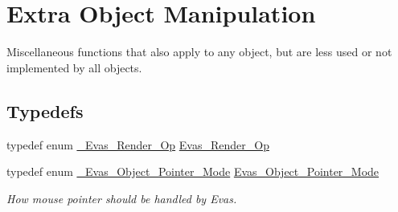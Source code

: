 \section{Extra Object Manipulation}
\label{group__Evas__Object__Group__Extras}


Miscellaneous functions that also apply to any object, but are less used or not implemented by all objects.  


\subsection*{Typedefs}
\begin{DoxyCompactItemize}
\item 
typedef enum \hyperlink{group__Evas__Object__Group__Extras_ga551375283a5e2b0abffd5f40582e9ce2}{\_\-Evas\_\-Render\_\-Op} \hyperlink{group__Evas__Object__Group__Extras_ga9c39a3ca795bbec3687fae9ee67d6056}{Evas\_\-Render\_\-Op}
\item 
typedef enum \hyperlink{group__Evas__Object__Group__Extras_ga822b2a69896ff21279debe2a417e3082}{\_\-Evas\_\-Object\_\-Pointer\_\-Mode} \hyperlink{group__Evas__Object__Group__Extras_ga27baac4c63b590de109e3e3f0d941483}{Evas\_\-Object\_\-Pointer\_\-Mode}
\begin{DoxyCompactList}\small\item\em How mouse pointer should be handled by Evas. \item\end{DoxyCompactList}\end{DoxyCompactItemize}
